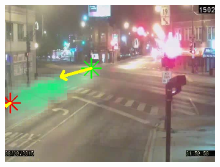 \begin{figure}
\begin{subfigure}{0.32\linewidth}
            \includegraphics[width=\linewidth]{./img/scene_learning/res/elstonIrvingPark-short/20150829_020000DST_elstonIrvingPark-1.jpg}
        \end{subfigure}


\end{figure}
